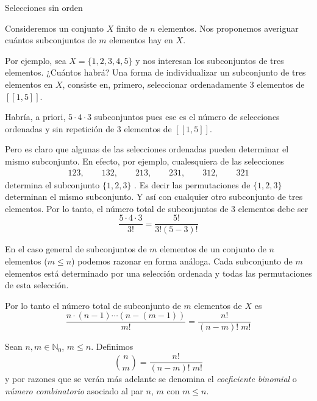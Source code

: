 \begin{section}{Selecciones sin orden}\label{seccion-selecciones-sin-orden}

Consideremos un conjunto $X$ finito de $n$ elementos. Nos proponemos averiguar cuántos subconjuntos de $m$ elementos hay en $X$.

\begin{ejemplo*}
Por ejemplo, sea $X = \{ 1, 2, 3, 4, 5 \}$ y nos interesan los subconjuntos de tres ele\-men\-tos. ¿Cuántos habrá? Una forma de individualizar un subconjunto de tres elementos en $X$, consiste en, primero, seleccionar  ordenadamente $3$ elementos de $[[ 1 , 5 ]]$. 

Habría, a priori, $5 \cdot 4 \cdot 3$ subconjuntos pues ese es el número de selecciones ordenadas y sin repetición de $3$ elementos de $[[ 1 , 5 ]]$.

Pero es claro que algunas de las selecciones ordenadas pueden determinar el mismo subconjunto. En efecto, por ejemplo, cualesquiera de las selecciones
\begin{align*}
1 2 3, \qquad  1 3 2, \qquad  2 1 3, \qquad 2 3 1, \qquad  3 1 2, \qquad  3 2 1
\end{align*}
determina el subconjunto $\{ 1, 2, 3\}$ . Es decir las permutaciones de $\{ 1, 2, 3\}$ determinan el mismo subconjunto.  Y así con cualquier otro
subconjunto de tres elementos. Por lo tanto, el número total de
subconjuntos de $3$ elementos debe ser
$$
\frac{5 \cdot 4 \cdot 3}{3!} =  \frac{5!}{3! (5 - 3)!}
$$
\end{ejemplo*}


En el caso general de subconjuntos de $m$ elementos de un
conjunto de $n$ elementos ($m \le n$) podemos razonar en forma análoga. Cada
subconjunto de $m$ elementos está determinado por una selección ordenada y todas las permutaciones de esta selección.

\label{eleciones-sin-orden-sin-repeticion} Por lo tanto el número total de subconjunto de $m$ elementos
de $X$ es
$$
\frac{n \cdot (n - 1) \cdots (n - (m - 1))}{m!} = \frac{n!}{(n - m)!\; m!}
$$

\begin{definicion}
Sean $n, m \in \mathbb N_0$, $m \le n$. Definimos
$$
\binom{n}{m} = \frac{n!}{(n - m)! \; m!}
$$
y por razones que se verán más adelante se denomina el {\em coeficiente binomial} o {\em número combinatorio} asociado al par $n$, $m$ con $m \le n$.



\end{definicion}
\end{section}
